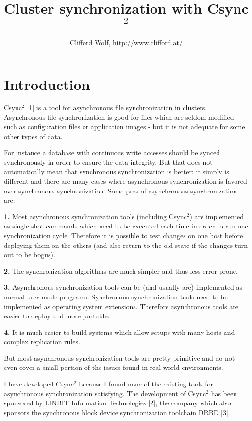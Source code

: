 \documentclass[a4paper,twocolumn]{article}
\def\csync2{{\sc Csync$^{2}$}}
\begin{document}
\title{Cluster synchronization with \csync2}
\author{Clifford Wolf, http://www.clifford.at/}
\maketitle

\section{Introduction}

\csync2 [1] is a tool for asynchronous file synchronization in clusters.
Asynchronous file synchronization is good for files which are seldom modified -
such as configuration files or application images - but it is not adequate for
some other types of data.

For instance a database with continuous write accesses should be synced
synchronously in order to ensure the data integrity. But that does not
automatically mean that synchronous synchronization is better; it simply is
different and there are many cases where asynchronous synchronization is
favored over synchronous synchronization. Some pros of asynchronous
synchronization are:

{\bf 1.}
Most asynchronous synchronization tools (including \csync2) are implemented as
single-shot commands which need to be executed each time in order to run one
synchronization cycle. Therefore it is possible to test changes on one host
before deploying them on the others (and also return to the old state if the
changes turn out to be bogus).

{\bf 2.}
The synchronization algorithms are much simpler and thus less error-prone.

{\bf 3.}
Asynchronous synchronization tools can be (and usually are) implemented as
normal user mode programs. Synchronous synchronization tools need to be
implemented as operating system extensions. Therefore asynchronous tools are
easier to deploy and more portable.

{\bf 4.}
It is much easier to build systems which allow setups with many hosts and
complex replication rules.

But most asynchronous synchronization tools are pretty primitive and do not
even cover a small portion of the issues found in real world environments.

I have developed \csync2 because I found none of the existing tools for
asynchronous synchronization satisfying. The development of \csync2 has
been sponsored by LINBIT Information Technologies [2], the company which also
sponsors the synchronous block device synchronization toolchain DRBD [3].
\end{document}
